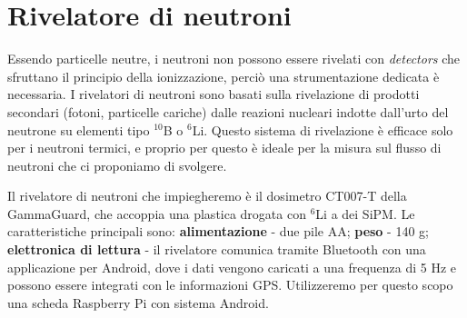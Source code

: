 \section*{Rivelatore di neutroni}
Essendo particelle neutre, i neutroni non possono essere rivelati con \emph{detectors} che sfruttano il principio della ionizzazione, perciò una strumentazione dedicata è necessaria. I rivelatori di neutroni sono basati sulla rivelazione di prodotti secondari (fotoni, particelle cariche) dalle reazioni nucleari indotte dall'urto del neutrone su elementi tipo $^{10}$B o $^6$Li. Questo sistema di rivelazione è efficace solo per i neutroni termici, e proprio per questo è ideale per la misura sul flusso di neutroni che ci proponiamo di svolgere.  

Il rivelatore di neutroni che impiegheremo è il dosimetro CT007-T della GammaGuard, che accoppia una plastica drogata con $^6$Li a dei SiPM. Le caratteristiche principali sono: \textbf{alimentazione} - due pile AA; \textbf{peso} - 140 g; \textbf{elettronica di lettura} - il rivelatore comunica tramite Bluetooth con una applicazione per Android, dove i dati vengono caricati a una frequenza di 5 Hz e possono essere integrati con le informazioni GPS. Utilizzeremo per questo scopo una scheda Raspberry Pi con sistema Android.  

